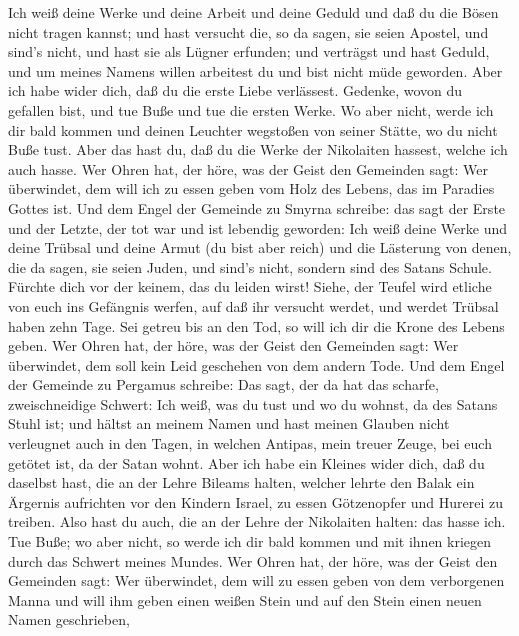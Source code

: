  Ich weiß deine Werke und deine Arbeit und deine Geduld und
daß du die Bösen nicht tragen kannst; und hast versucht die, so da
sagen, sie seien Apostel, und sind's nicht, und hast sie als Lügner
erfunden;  und verträgst und hast Geduld, und um meines
Namens willen arbeitest du und bist nicht müde geworden. 
Aber ich habe wider dich, daß du die erste Liebe verlässest.
 Gedenke, wovon du gefallen bist, und tue Buße und tue die
ersten Werke. Wo aber nicht, werde ich dir bald kommen und deinen
Leuchter wegstoßen von seiner Stätte, wo du nicht Buße tust.
 Aber das hast du, daß du die Werke der Nikolaiten hassest,
welche ich auch hasse.  Wer Ohren hat, der höre, was der
Geist den Gemeinden sagt: Wer überwindet, dem will ich zu essen geben
vom Holz des Lebens, das im Paradies Gottes ist.  Und dem
Engel der Gemeinde zu Smyrna schreibe: das sagt der Erste und der
Letzte, der tot war und ist lebendig geworden:  Ich weiß
deine Werke und deine Trübsal und deine Armut (du bist aber reich) und
die Lästerung von denen, die da sagen, sie seien Juden, und sind's
nicht, sondern sind des Satans Schule.  Fürchte dich vor
der keinem, das du leiden wirst! Siehe, der Teufel wird etliche von euch
ins Gefängnis werfen, auf daß ihr versucht werdet, und werdet Trübsal
haben zehn Tage. Sei getreu bis an den Tod, so will ich dir die Krone
des Lebens geben.  Wer Ohren hat, der höre, was der Geist
den Gemeinden sagt: Wer überwindet, dem soll kein Leid geschehen von dem
andern Tode.  Und dem Engel der Gemeinde zu Pergamus
schreibe: Das sagt, der da hat das scharfe, zweischneidige Schwert:
 Ich weiß, was du tust und wo du wohnst, da des Satans
Stuhl ist; und hältst an meinem Namen und hast meinen Glauben nicht
verleugnet auch in den Tagen, in welchen Antipas, mein treuer Zeuge, bei
euch getötet ist, da der Satan wohnt.  Aber ich habe ein
Kleines wider dich, daß du daselbst hast, die an der Lehre Bileams
halten, welcher lehrte den Balak ein Ärgernis aufrichten vor den Kindern
Israel, zu essen Götzenopfer und Hurerei zu treiben.  Also
hast du auch, die an der Lehre der Nikolaiten halten: das hasse ich.
 Tue Buße; wo aber nicht, so werde ich dir bald kommen und
mit ihnen kriegen durch das Schwert meines Mundes.  Wer
Ohren hat, der höre, was der Geist den Gemeinden sagt: Wer überwindet,
dem will zu essen geben von dem verborgenen Manna und will ihm geben
einen weißen Stein und auf den Stein einen neuen Namen geschrieben,
